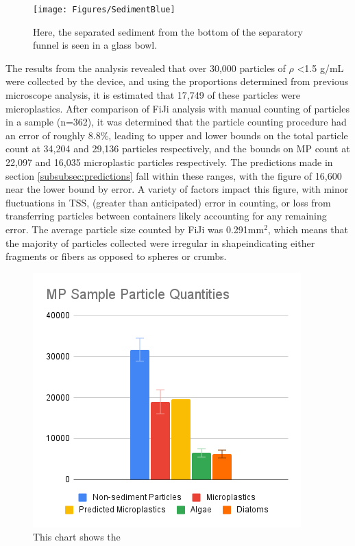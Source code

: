 \documentclass[fleqn,10pt]{SelfArx} %
\begin{document}
	\begin{figure}[h]
		\centering
		\texttt{[image: Figures/SedimentBlue]}
		\caption[Separated Sediment]{Here, the separated sediment from the bottom of the separatory funnel is seen in a glass bowl.}
		\label{fig:SedBlue}
	\end{figure}
	The results from the analysis revealed that over 30,000 particles of $\rho$ \textless 1.5 g/mL were collected by the device, and using the proportions determined from previous microscope analysis, it is estimated that 17,749 of these particles were microplastics. After comparison of FiJi analysis with manual counting of particles in a sample (n=362), it was determined that the particle counting procedure had an error of roughly 8.8\%, leading to upper and lower bounds on the total particle count at 34,204 and 29,136 particles respectively, and the bounds on MP count at 22,097 and 16,035 microplastic particles respectively. The predictions made in section \ref{subsubsec:predictions} fall within these ranges, with the figure of 16,600 near the lower bound by error. A variety of factors impact this figure, with minor fluctuations in TSS, (greater than anticipated) error in counting, or loss from transferring particles between containers likely accounting for any remaining error. The average particle size counted by FiJi was 0.291mm$^2$, which means that the majority of particles collected were irregular in shape\textemdash indicating either fragments or fibers as opposed to spheres or crumbs. 
		\begin{figure}[h]
		\centering
		\includegraphics[width=1\linewidth]{Figures/TotalQuantities}
		\caption[Cumulative Non-Sediment Particle Quantities]{This chart shows the }
		\label{fig:totalcount}
	\end{figure}
	
\end{document}
